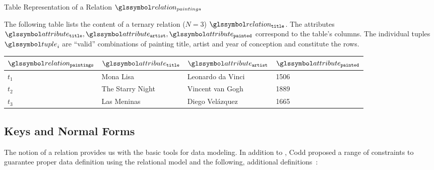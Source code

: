 \begin{example}[label=example:relational_table]{Table Representation of a Relation $\relation_{paintings}$}{}
    
    The following table lists the content of a ternary relation ($N = 3$) $\relation_{\mathtt{title}}$. The attributes $\attribute_{\mathtt{title}}, \attribute_{\mathtt{artist}}, \attribute_{\mathtt{painted}}$ correspond to the table's columns. The individual tuples $\tuple_i$ are ``valid'' combinations of painting title, artist and year of conception and constitute the rows.
        
    \begin{center}
        \begin{tabular}{ l || l | l | l |}
            $\relation_{\mathtt{paintings}}$ & $\attribute_\mathtt{title}$  & $\attribute_{\mathtt{artist}}$  & $\attribute_{\mathtt{painted}}$ \\ 
            \hline
            \hline
            $t_1$ & Mona Lisa &  Leonardo da Vinci & 1506 \\
            \hline
            $t_2$ & The Starry Night & Vincent van Gogh & 1889 \\
            \hline
            $t_3$ & Las Meninas & Diego Velázquez & 1665 \\
            \hline
        \end{tabular}
    \end{center}
\end{example}


\subsection{Keys and Normal Forms}

The notion of a relation provides us with the basic tools for data modeling. In addition to , Codd proposed a range of constraints to guarantee proper data definition using the relational model and the following, additional definitions~\cite{Codd:1970Relational}:

